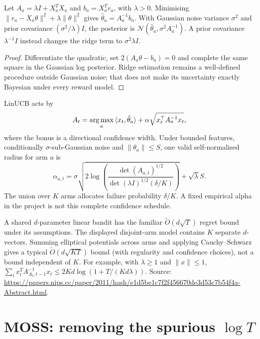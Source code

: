\documentclass[11pt,oneside]{scrbook}
\begin{document}
\begin{theorem}
Let $A_a=\lambda I+X_a^TX_a$ and $b_a=X_a^Tr_a$, with $\lambda>0$.
Minimising $\|r_a-X_a\theta\|^2+\lambda\|\theta\|^2$ gives
$\hat\theta_a=A_a^{-1}b_a$.
With Gaussian noise variance $\sigma^2$ and prior covariance
$(\sigma^2/\lambda)I$, the posterior is
$\mathcal N(\hat\theta_a,\sigma^2 A_a^{-1})$.
A prior covariance $\lambda^{-1}I$ instead changes the ridge term to
$\sigma^2\lambda I$.
\end{theorem}
\begin{proof}
Differentiate the quadratic, set $2(A_a\theta-b_a)=0$ and complete the
same square in the Gaussian log posterior. Ridge estimation remains a
well-defined procedure outside Gaussian noise; that does not make its
uncertainty exactly Bayesian under every reward model.
\end{proof}

LinUCB acts by
\[
A_t = \operatorname*{arg\,max}_a\, \langle x_t, \hat\theta_a\rangle + \alpha\sqrt{x_t^\top A_a^{-1} x_t},
\]
where the bonus is a directional confidence width. Under bounded features,
conditionally $\sigma$-sub-Gaussian noise and $\|\theta_a\|\le S$, one
valid self-normalised radius for arm $a$ is
\[
\alpha_{a,t}=\sigma\sqrt{2\log\!\left(
\frac{\det(A_{a,t})^{1/2}}{\det(\lambda I)^{1/2}(\delta/K)}
\right)}+\sqrt\lambda S.
\]
The union over $K$ arms allocates failure probability $\delta/K$.
A fixed empirical alpha in the project is not this complete confidence schedule.

\begin{remark}
A shared $d$-parameter linear bandit has the familiar
$\widetilde O(d\sqrt T)$ regret bound under its assumptions.
The displayed disjoint-arm model contains $K$ separate $d$-vectors.
Summing elliptical potentials across arms and applying Cauchy--Schwarz
gives a typical $\widetilde O(d\sqrt{KT})$ bound (with regularity and
confidence choices), not a bound independent of $K$.
For example, with $\lambda\ge1$ and $\|x\|\le1$,
$\sum_t x_t^TA_{A_t,t-1}^{-1}x_t\le2Kd\log(1+T/(Kd\lambda))$.
Source: \url{https://papers.nips.cc/paper/2011/hash/e1d5be1c7f2f456670de3d53c7b54f4a-Abstract.html}.
\end{remark}

\section{MOSS: removing the spurious $\log T$}
\end{document}
